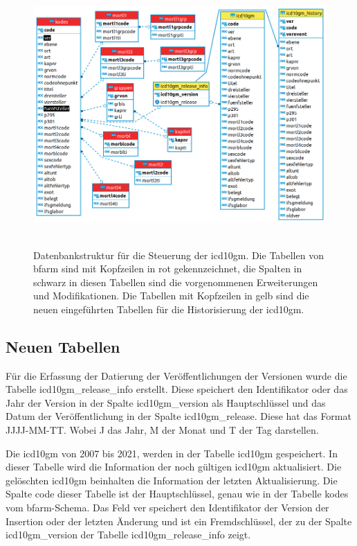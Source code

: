 \clearpage	

\begin{figure}[ht]
	\centering
	\includegraphics[height=10cm]{figures/icdSqlSchema}
	\caption[Datenbankstruktur]{Datenbankstruktur für die Steuerung der \ac{icd10gm}. Die Tabellen von \ac{bfarm} sind mit Kopfzeilen in rot gekennzeichnet, die Spalten in schwarz in diesen Tabellen sind die vorgenommenen Erweiterungen und Modifikationen. Die Tabellen mit Kopfzeilen in gelb sind die neuen eingeführten Tabellen für die Historisierung der \ac{icd10gm}.}
	\label{fig:reldb2}
\end{figure}

\subsection{Neuen Tabellen} \label{subsec:newtables}

Für die Erfassung der Datierung der Veröffentlichungen der Versionen wurde die Tabelle \glqq\textsf{icd10gm\_release\_info}\grqq{} erstellt. Diese speichert den Identifikator oder das Jahr der Version in der Spalte \glqq\textsf{icd10gm\_version}\grqq{} als Hauptschlüssel und das Datum der Veröffentlichung in der Spalte \glqq\textsf{icd10gm\_release}\grqq{}. Diese hat das Format \glqq\textsf{JJJJ-MM-TT}\grqq{}. Wobei \glqq J\grqq{} das Jahr, \glqq M\grqq{} der Monat und \glqq T\grqq{} der Tag darstellen.

Die \ac{icd10gm} von 2007 bis 2021, werden in der Tabelle \glqq\textsf{icd10gm}\grqq{} gespeichert. In dieser Tabelle wird die Information der noch gültigen \ac{icd10gm} aktualisiert. Die gelöschten \ac{icd10gm} beinhalten die Information der letzten Aktualisierung. Die Spalte \textsf{code}\grqq{} dieser Tabelle ist der Hauptschlüssel, genau wie in der Tabelle \glqq\textsf{kodes}\grqq{} vom \ac{bfarm}-Schema. Das Feld \glqq\textsf{ver}\grqq{} speichert den Identifikator der Version der Insertion oder der letzten Änderung und ist ein Fremdschlüssel, der zu der Spalte \glqq\textsf{icd10gm\_version}\grqq{} der Tabelle \glqq\textsf{icd10gm\_release\_info}\grqq{} zeigt.

